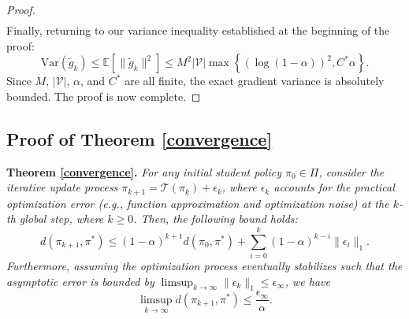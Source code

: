 \documentclass{article}
\theoremstyle{plain}
\theoremstyle{definition}
\theoremstyle{remark}
\begin{document}
\begin{proof}
\begin{equation}
\begin{split}
		\end{split}
	\end{equation}
	Finally, returning to our variance inequality established at the beginning of the proof:
	\begin{equation}
		\mathrm{Var}(\tilde{g}_k) \leq \mathbb{E}\left[\lVert\tilde{g}_k\rVert^2\right] \leq M^2\lvert\mathcal{V}\rvert\max\left\{\left(\log(1-\alpha)\right)^2, C^*\alpha\right\}.
	\end{equation}
	Since $M$, $\lvert\mathcal{V}\rvert$, $\alpha$, and $C^*$ are all finite, the exact gradient variance is absolutely bounded. The proof is now complete.
\end{proof}






\subsection{Proof of Theorem \ref{convergence}} \label{proof of convergence}
\textbf{Theorem \ref{convergence}.} \textit{
	For any initial student policy $\pi_0\in\Pi$, consider the iterative update process $\pi_{k+1}=\mathcal{T}(\pi_k)+\epsilon_k$, where $\epsilon_k$ accounts for the practical optimization error (e.g., function approximation and optimization noise) at the $k$-th global step, where $k\geq0$. Then, the following bound holds:
	\begin{equation}
		d(\pi_{k+1},\pi^*)\leq(1-\alpha)^{k+1}d(\pi_0,\pi^*)+\sum_{i=0}^{k}(1-\alpha)^{k-i}\lVert\epsilon_i\rVert_1.
	\end{equation}
	Furthermore, assuming the optimization process eventually stabilizes such that the asymptotic error is bounded by $\limsup_{k\rightarrow \infty}\lVert\epsilon_{k}\rVert_1\leq \epsilon_{\infty}$, we have
	\begin{equation}
		\limsup_{k \rightarrow \infty} d(\pi_{k+1}, \pi^*) \leq \frac{\epsilon_{\infty}}{\alpha}.
	\end{equation}
}
\end{document}
